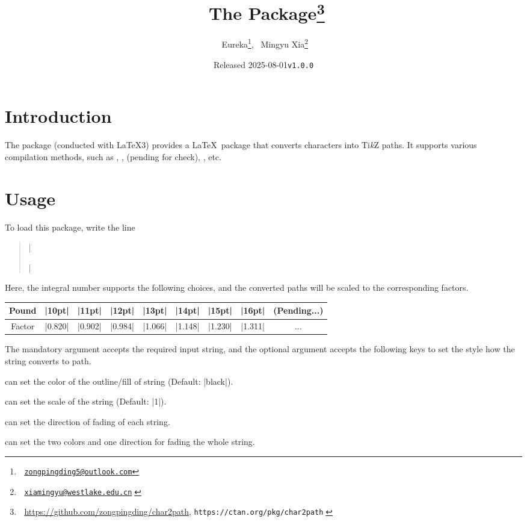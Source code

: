\documentclass[lm-default]{l3doc}
\title{^^A
  The \pkg{char2path} Package\thanks{^^A
    \url{https://github.com/zongpingding/char2path},
    \texttt{https://ctan.org/pkg/char2path}^^A
  }^^A
}
\author{^^A
  Eureka\thanks{^^A
    \href{mailto:zongpingding5@outlook.com}{\texttt{zongpingding5@outlook.com}}},~
  Mingyu Xia\thanks{^^A
    \href{mailto:xiamingyu@westlake.edu.cn}{\texttt{xiamingyu@westlake.edu.cn}}^^A
  }^^A
}
\date{Released 2025-08-01\quad \texttt{v1.0.0}}
\begin{document}
\maketitle

\begin{documentation}

\section{Introduction}

The  package (conducted with \LaTeX3) provides
a \LaTeX\ package that converts characters into Ti\textit k\/Z paths.
It supports various compilation methods, such as ,
,  (pending for check), , etc.

\section{Usage}

To load this package, write the line
\begin{quote}
  |\usepackage[scale = ||pt]{char2path}|
\end{quote}

Here, the integral number  supports the following choices,
and the converted paths will be scaled to the corresponding factors.

\begin{center}
  \begin{tabular}{*9c}
    \toprule
    Pound   & |10pt|  & |11pt|  & |12pt|  &
    |13pt|  & |14pt|  & |15pt|  & |16pt|  & (Pending...)\\
    \midrule
    Factor  & |0.820| & |0.902| & |0.984| &
    |1.066| & |1.148| & |1.230| & |1.311| & ...\\
    \bottomrule
  \end{tabular}
\end{center}

\begin{function}{\chartopath}
  \begin{syntax}
      
  \end{syntax}
  The mandatory argument accepts the required input string, and the optional
  argument accepts the following keys to set the style how the string converts
  to path.
  \begin{keyval}
    \item [\key{draw,fill}]  can set the color of the outline/fill of string
    (Default: |black|).
    \item [\key{scale}]  can set the scale of the string
    (Default: |1|).
    \item [\key{path fading}]  can set the direction of
    fading of each string.
    \item [\key{fading}]  can set the two colors and one direction for fading the whole string.
  \end{keyval}
\end{function}



\end{documentation}
\end{document}
